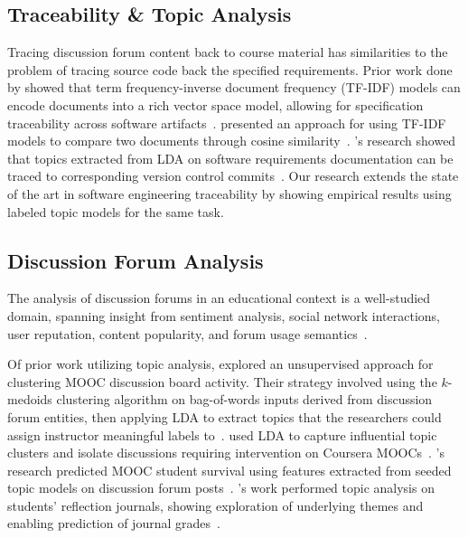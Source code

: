 \documentclass[sigconf, anonymous]{acmart}
\begin{document}
\subsection{Traceability \& Topic Analysis}
Tracing discussion forum content back to course material has similarities to the problem of tracing source code back the specified requirements.
Prior work done by \citeauthor{4556122} showed that term frequency-inverse document frequency (TF-IDF) models can encode documents into a rich vector space model, allowing for specification traceability across software artifacts~\cite{4556122}.
\citeauthor{Tata:2007:EST:1328854.1328855} presented an approach for using TF-IDF models to compare two documents through cosine similarity~\cite{Tata:2007:EST:1328854.1328855}.
\citeauthor{hindle2012relating}'s research showed that topics extracted from LDA on software requirements documentation can be traced to corresponding version control commits~\cite{hindle2012relating}.
Our research extends the state of the art in software engineering traceability by showing empirical results using labeled topic models for the same task.


\subsection{Discussion Forum Analysis}
The analysis of discussion forums in an educational context is a well-studied domain, spanning insight from sentiment analysis, social network interactions, user reputation, content popularity, and forum usage semantics~\cite{wen2014sentiment,wong2015analysis,coetzee2014should,breslow2013studying,onah2014exploring}.

Of prior work utilizing topic analysis, \citeauthor{ezen2015unsupervised} explored an unsupervised approach for clustering MOOC discussion board activity. Their strategy involved using the $k$-medoids clustering algorithm on bag-of-words inputs derived from discussion forum entities, then applying LDA to extract topics that the researchers could assign instructor meaningful labels to~\cite{ezen2015unsupervised}.
\citeauthor{atapattu2016topic} used LDA to capture influential topic clusters and isolate discussions requiring intervention on Coursera MOOCs~\cite{atapattu2016topic}.
\citeauthor{ramesh2014understanding}'s research predicted MOOC student survival using features extracted from seeded topic models on discussion forum posts~\cite{ramesh2014understanding}.
\citeauthor{Chen:2016:TME:2883851.2883951}'s work performed topic analysis on students' reflection journals, showing exploration of underlying themes and enabling prediction of journal grades~\cite{Chen:2016:TME:2883851.2883951}.
\end{document}
